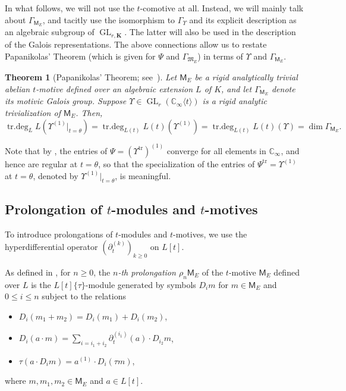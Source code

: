 \documentclass[10pt,a4paper]{amsart}
\theoremstyle{plain} %
\newtheorem{Theorem}{Theorem}[section]
\theoremstyle{definition}
\theoremstyle{remark}
\newcommand{\CC}{\mathbb{C}}
\newcommand{\bK}{\mathbf{K}}
\newcommand{\tr}{\operatorname{tr}}
\newcommand{\trdeg}{\operatorname{tr.deg}}
\newcommand{\GL}{\operatorname{GL}}
\newcommand{\KI}{\mathbb{K}_{\infty}}  %
\newcommand{\CI}{\CC_{\infty}}  %
\newcommand{\mot}{\mathsf{M}}  %
\newcommand{\dmot}{\mathfrak{M}} %
\newcommand{\hde}[1]{\partial^{(#1)}}  %
\numberwithin{equation}{subsection}
\begin{document}
\medskip

In what follows, we will not use the $t$-comotive at all. Instead, we will mainly talk about $\Gamma_{\mot_E}$, and tacitly use the isomorphism to $\Gamma_{\Upsilon}$ and its explicit description as an algebraic subgroup of $\GL_{r,\bK}$. The latter  will also be used in the description of the Galois representations. The above connections allow us to restate Papanikolas' Theorem (which is given for $\Psi$ and $\Gamma_{\dmot_E}$) in terms of $\Upsilon$ and $\Gamma_{\mot_E}$.




\begin{Theorem}[{Papanikolas' Theorem; see~\cite[Thm.~1.1.7]{mp:tdadmaicl}}] \label{T:Pap}
Let $\mot_E$ be a rigid analytically trivial abelian $t$-motive defined over an algebraic extension $L$ of $K$, and let $\Gamma_{\mot_E}$ denote its motivic Galois group. Suppose 
$\Upsilon \in \GL_r(\CC_\infty \langle t \rangle)$ is a rigid analytic trivialization of $\mot_E$. 
Then,
\[
\trdeg_{L} L(\Upsilon^{(1)}|_{t=\theta}) = \trdeg_{L(t)} L(t)(\Upsilon^{(1)}) = \trdeg_{L(t)} L(t)(\Upsilon) = \dim \Gamma_{\mot_E}. 
\]
\end{Theorem}

Note that by \cite[Prop.~3.1.3]{ga-wb-mp:darasgvpc}, the entries of  $\Psi=(\Upsilon^{\tr})^{(1)}$ converge for all elements in $\CI$, and hence are regular at $t=\theta$, so that the specialization of the entries of $\Psi^{\tr}=\Upsilon^{(1)}$ at $t=\theta$, denoted by $\Upsilon^{(1)}|_{t=\theta}$, is meaningful. 


\subsection{Prolongation of \texorpdfstring{$t$}{t}-modules and \texorpdfstring{$t$}{t}-motives}\label{Sub:Promodulesmotives}

To introduce prolongations of $t$-modules and $t$-motives, we use the hyperdifferential operator $(\hde{k}_t)_{k\geq 0}$ on $L[t]$.


As defined in \cite{am:ptmaip}, for $n \geq 0$, the \emph{$n$-th prolongation $\rho_n\mot_E$} of the $t$-motive $\mot_E$ defined over $L$ is the $L[t]\{\tau\}$-module generated by symbols $D_im$ for $m \in \mot_E$ and $0\leq i \leq n$ subject to the relations
\begin{itemize}
\item[(a)] $D_i(m_1+m_2) = D_i(m_1)+D_i(m_2)$,
\item[(b)] $D_i(a\cdot m) = \sum_{i=i_1+i_2} \hde{i_1}_{t}(a)\cdot D_{i_2}m$,
\item[(c)] $\tau(a\cdot D_i m) = a^{(1)} \cdot D_i(\tau m)$,
\end{itemize}
where $m, m_1, m_2 \in \mot_E$ and $a \in L[t]$.
\end{document}
